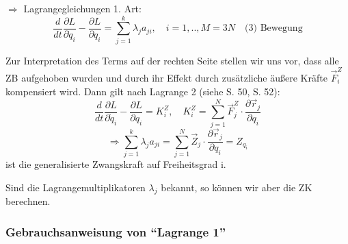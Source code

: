 \documentclass[10pt, letterpaper]{article}
\begin{document}
$\Rightarrow$ Lagrangegleichungen 1. Art:
\[\frac{d}{dt}\frac{\partial L}{\partial \dot{q}_i} - \frac{\partial L}{\partial q_i} = \sum_{j=1}^k \lambda_j a_{ji}, \quad i=1,..,M=3N \quad \text{(3) Bewegung}\]



Zur Interpretation des Terms auf der rechten Seite stellen wir uns vor, dass alle ZB aufgehoben wurden und durch ihr Effekt durch zusätzliche äußere Kräfte $\vec{F}_i^Z$ kompensiert wird. Dann gilt nach Lagrange 2 (siehe S. 50, S. 52):
\[\frac{d}{dt}\frac{\partial L}{\partial \dot{q}_i} - \frac{\partial L}{\partial q_i} = K_i^Z, \quad K_i^Z = \sum_{j=1}^N \vec{F}_j^Z \cdot \frac{\partial \vec{r}_j}{\partial q_i}\]
\[\Rightarrow \sum_{j=1}^k \lambda_j a_{ji} = \sum_{j=1}^N \vec{Z}_j \cdot \frac{\partial \vec{r}_j}{\partial q_i} = Z_{q_i}\]
ist die generalisierte Zwangskraft auf Freiheitsgrad i.

Sind die Lagrangemultiplikatoren $\lambda_j$ bekannt, so können wir aber die ZK berechnen.




\subsubsection{Gebrauchsanweisung von ``Lagrange 1''}
\end{document}
